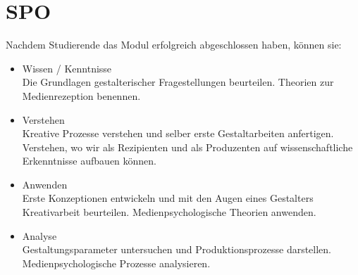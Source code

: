 \section{SPO}
    Nachdem Studierende das Modul erfolgreich abgeschlossen haben, können sie:
    \begin{itemize}
        \item Wissen / Kenntnisse\\
            Die Grundlagen gestalterischer Fragestellungen beurteilen.
            \newline
            Theorien zur Medienrezeption benennen.
        \item Verstehen\\
            Kreative Prozesse verstehen und selber erste Gestaltarbeiten anfertigen.
            \newline
            Verstehen, wo wir als Rezipienten und als Produzenten auf wissenschaftliche Erkenntnisse aufbauen können.
        \item Anwenden\\
            Erste Konzeptionen entwickeln und mit den Augen eines Gestalters Kreativarbeit beurteilen. \newline
            Medienpsychologische Theorien anwenden.
        \item Analyse\\
            Gestaltungsparameter untersuchen und Produktionsprozesse darstellen.
            \newline
            Medienpsychologische Prozesse analysieren.
    \end{itemize}
    
\newpage